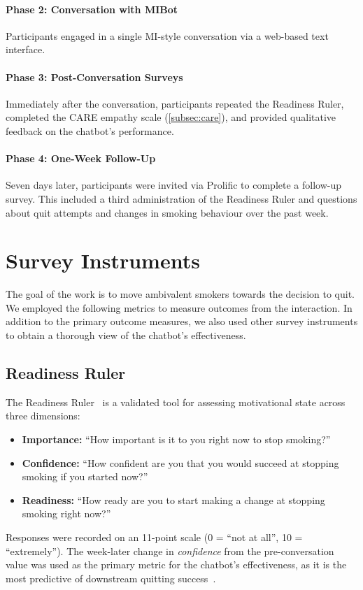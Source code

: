 \paragraph{Phase 2: Conversation with MIBot}
Participants engaged in a single MI-style conversation via a web-based text interface.

\paragraph{Phase 3: Post-Conversation Surveys}
Immediately after the conversation, participants repeated the Readiness Ruler, completed the CARE empathy scale (\cref{subsec:care}), and provided qualitative feedback on the chatbot's performance.

\paragraph{Phase 4: One-Week Follow-Up}
Seven days later, participants were invited via Prolific to complete a follow-up survey. This included a third administration of the Readiness Ruler and questions about quit attempts and changes in smoking behaviour over the past week.

\section{Survey Instruments}
\label{subsec:survey-instruments}

The goal of the work is to move ambivalent smokers towards the decision to quit. We employed the following metrics to measure outcomes from the interaction. In addition to the primary outcome measures, we also used other survey instruments to obtain a thorough view of the chatbot's effectiveness.

\subsection{Readiness Ruler}
\label{subsec:readiness-ruler}
The Readiness Ruler~\citep{rollnick1992development} is a validated tool for assessing motivational state across three dimensions:
\begin{itemize}
	\item \textbf{Importance:} ``How important is it to you right now to stop smoking?''
	\item \textbf{Confidence:} ``How confident are you that you would succeed at stopping smoking if you started now?''
	\item \textbf{Readiness:} ``How ready are you to start making a change at stopping smoking right now?''
\end{itemize}
Responses were recorded on an 11-point scale (0 = ``not at all'', 10 = ``extremely''). The week-later change in \emph{confidence} from the pre-conversation value was used as the primary metric for the chatbot's effectiveness, as it is the most predictive of downstream quitting success~\citep{Gwaltney2009-wj,Abar2013}.

